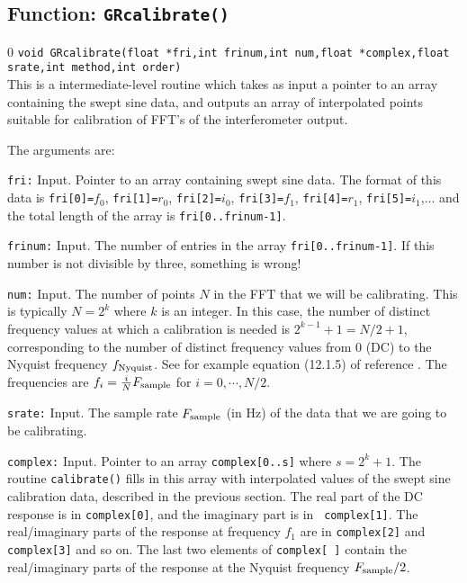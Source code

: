 \subsection{Function: {\tt GRcalibrate()}}
\label{ss:GRcalibrate}
\setcounter{equation}0
{\tt void GRcalibrate(float *fri,int frinum,int num,float *complex,float srate,int method,int order) }\\
This is a intermediate-level routine which 
takes as input a pointer to an array containing the swept sine data, and
outputs an array of interpolated points suitable for calibration of
FFT's of the interferometer output.

The arguments are:
\begin{description}
\item{\tt fri:} Input.  Pointer to an array containing
  swept sine data.  The format of this data is {\tt fri[0]=}$f_0$,
{\tt fri[1]=}$r_0$, {\tt fri[2]=}$i_0$,
{\tt fri[3]=}$f_1$,
{\tt fri[4]=}$r_1$, {\tt fri[5]=}$i_1$,... and the total length of the
array is {\tt fri[0..frinum-1]}.
\item{\tt frinum:} Input.  The number of entries in the array  {\tt fri[0..frinum-1]}.
If this number is not divisible by three, something is wrong!
\item{\tt num:} Input.  The number of points $N$ in the FFT that we
 will be calibrating.  This is typically $N=2^k$ where $k$ is an
 integer.  In this case, the number of distinct frequency values at
 which a calibration is needed is $2^{k-1}+1 = N/2+1$, corresponding to
 the number of distinct frequency values from $0$ (DC) to the Nyquist
 frequency $f_{\rm Nyquist}$.  See for example equation (12.1.5) of
 reference \cite{NumRec}.  The frequencies are $f_i = {i \over N}
 F_{\rm sample}$ for $i=0,\cdots,N/2$.
\item{\tt srate:} Input.  The sample rate $F_{\rm sample}$ (in Hz) of the data that
  we are going to be calibrating.
\item{\tt complex:} Input.  Pointer to an array {\tt complex[0..s]}
  where $s=2^k+1$.  The routine {\tt  calibrate()} fills in this array
  with interpolated values of the swept sine calibration data,
  described in the previous section.  The real part of the DC response
  is in {\tt complex[0]}, and the imaginary part is in {\tt
  complex[1]}. The real/imaginary parts of the response at frequency
  $f_1$ are in {\tt complex[2]} and {\tt complex[3]} and so on.  The
  last two elements of {\tt complex[ ]} contain the real/imaginary parts
  of the response at the Nyquist frequency $F_{\rm sample}/2$.

\end{description}
